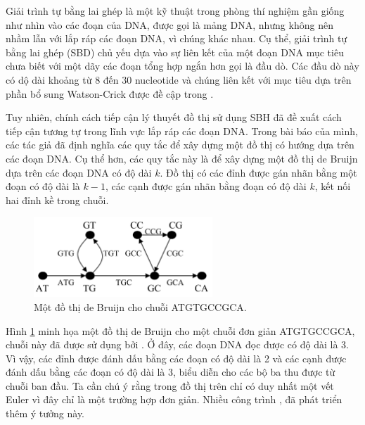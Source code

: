 \documentclass[14pt, a4paper]{article}
\numberwithin{equation}{section}
\numberwithin{figure}{section}
\numberwithin{dl}{section}
\numberwithin{md}{section}
\numberwithin{bd}{section}
\numberwithin{dn}{section}
\numberwithin{hq}{section}
\begin{document}
    Giải trình tự bằng lai ghép là một kỹ thuật trong phòng thí nghiệm gần giống như nhìn vào các đoạn của DNA,
    được gọi là mảng DNA, nhưng không nên nhầm lẫn với lắp ráp các đoạn DNA, vì chúng khác nhau.
    Cụ thể, giải trình tự bằng lai ghép (SBD) chủ yếu dựa vào sự liên kết của một đoạn DNA mục tiêu chưa biết với một dãy các đoạn tổng hợp ngắn hơn gọi là đầu dò.
    Các đầu dò này có dộ dài khoảng từ 8 đến 30 nucleotide và chúng liên kết với mục tiêu dựa trên phần bổ sung Watson-Crick được đề cập trong \cite{de1946combinatorial}.

    Tuy nhiên, chính cách tiếp cận lý thuyết đồ thị sử dụng SBH \cite{idury1995new} đã đề xuất cách tiếp cận tương tự trong lĩnh vực lắp ráp các đoạn DNA.
    Trong bài báo của mình, các tác giả đã định nghĩa các quy tắc để xây dựng một đồ thị có hướng dựa trên các đoạn DNA.
    Cụ thể hơn, các quy tắc này là để xây dựng một đồ thị de Bruijn dựa trên các đoạn DNA có độ dài $k$.
    Đồ thị có các đỉnh được gán nhãn bằng một đoạn có độ dài là $k-1$, các cạnh được gán nhãn bằng đoạn có độ dài $k$, kết nối hai đỉnh kề trong chuỗi.

    \begin{figure}[h!]
        \centering
        \includegraphics[width=0.6\textwidth]{2.png}
        \caption{Một đồ thị de Bruijn cho chuỗi ATGTGCCGCA.}
        \label{fig:2}
    \end{figure}

    Hình \ref{fig:2} minh họa một đồ thị de Bruijn cho một chuỗi đơn giản ATGTGCCGCA, chuỗi này đã được sử dụng bởi \cite{idury1995new}.
    Ở đây, các đoạn DNA đọc được có độ dài là 3.
    Vì vậy, các đỉnh được đánh dấu bằng các đoạn có độ dài là 2 và các cạnh được đánh dấu bằng các đoạn có độ dài là 3, biểu diễn cho các bộ ba thu được từ chuỗi ban đầu.
    Ta cần chú ý rằng trong đồ thị trên chỉ có duy nhất một vết Euler vì đây chỉ là một trường hợp đơn giản.
    Nhiều công trình \cite{pevzner2000computational}, \cite{pevzner1995dna} đã phát triển thêm ý tưởng này.
\end{document}
